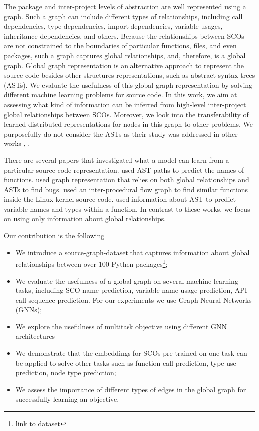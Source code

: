 \documentclass[a4paper,twoside]{article}
\begin{document}
The package and inter-project levels of abstraction are well represented using a graph. Such a graph can include different types of relationships, including call dependencies, type dependencies, import dependencies, variable usages, inheritance dependencies, and others. Because the relationships between SCOs are not constrained to the boundaries of particular functions, files, and even packages, such a graph captures global relationships, and, therefore, is a global graph. Global graph representation is an alternative approach to represent the source code besides other structures representations, such as abstract syntax trees (ASTs). We evaluate the usefulness of this global graph representation by solving different machine learning problems for source code. In this work, we aim at assessing what kind of information can be inferred from high-level inter-project global relationships between SCOs. Moreover, we look into the transferability of learned distributed representations for nodes in this graph to other problems. We purposefully do not consider the ASTs as their study was addressed in other works \cite{Alon2018}, \cite{Yahav2018}.

There are several papers that investigated what a model can learn from a particular source code representation. \cite{Alon2018a} used AST paths to predict the names of functions. \cite{Allamanis2017} used graph representation that relies on both global relationships and ASTs to find bugs. \cite{DeFreez2018} used an inter-procedural flow graph to find similar functions inside the Linux kernel source code. \cite{Raychev2015} used information about AST to predict variable names and types within a function. In contrast to these works, we focus on using only information about global relationships. 

Our contribution is the following
\begin{itemize}
    \item We introduce a source-graph-dataset that captures information about global relationships between over 100 Python packages\footnote{link to dataset};
    \item We evaluate the usefulness of a global graph on several machine learning tasks, including SCO name prediction, variable name usage prediction, API call sequence prediction. For our experiments we use Graph Neural Networks (GNNs);
    \item We explore the usefulness of multitask objective using different GNN architectures
    \item We demonstrate that the embeddings for SCOs pre-trained on one task can be applied to solve other tasks such as function call prediction, type use prediction, node type prediction;
    \item We assess the importance of different types of edges in the global graph for successfully learning an objective. 
\end{itemize}
\end{document}
